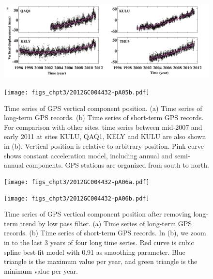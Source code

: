 \clearpage
\begin{figure}
	\centering
	\includegraphics{figs_chpt3/2012GC004432-pA05a.pdf}
	\label{fig:SI3_fig5a}
\end{figure}

\clearpage
\begin{figure}
	\centering
	\texttt{[image: figs\_chpt3/2012GC004432-pA05b.pdf]}
	\caption[Time series of GPS vertical component position.]{Time series of GPS vertical component position.  (a) Time series of long-term GPS records. (b) Time series of short-term GPS records.  For comparison with other sites, time series between mid-2007 and early 2011 at sites KULU, QAQ1, KELY and KULU are also shown in (b).  Vertical position is relative to arbitrary position. Pink curve shows constant acceleration model, including annual and semi-annual components.  GPS stations are organized from south to north.}
	\label{fig:SI3_fig5b}
\end{figure}

\clearpage
\begin{figure}
	\centering
	\texttt{[image: figs\_chpt3/2012GC004432-pA06a.pdf]}
	\label{fig:SI3_fig6a}
\end{figure}

\clearpage
\begin{figure}
	\centering
	\texttt{[image: figs\_chpt3/2012GC004432-pA06b.pdf]}
	\caption[Time series of GPS vertical component position after removing long-term trend by low pass filter.]{Time series of GPS vertical component position after removing long-term trend by low pass filter. (a) Time series of long-term GPS records. (b) Time series of short-term GPS records. In (b), we zoom in to the last 3 years of four long time series. Red curve is cubic spline best-fit model with 0.91 as smoothing parameter.  Blue triangle is the maximum value per year, and green triangle is the minimum value per year.}
	\label{fig:SI3_fig6b}
\end{figure}

